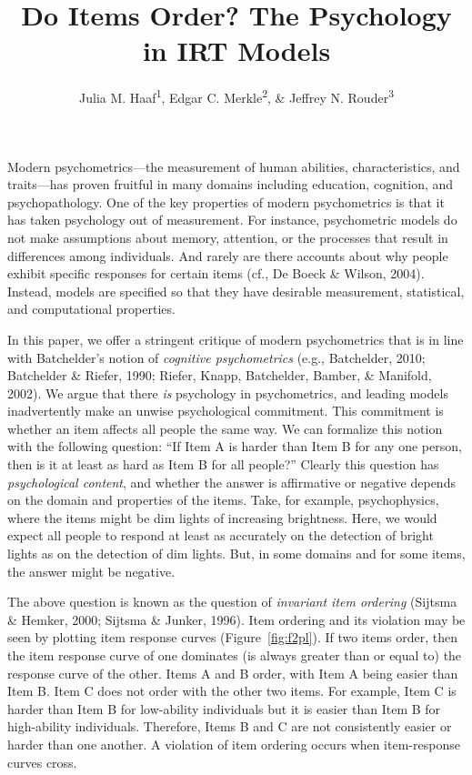 \documentclass[english,,man]{apa6}
\title{Do Items Order? The Psychology in IRT Models}
\author{Julia M. Haaf\textsuperscript{1}, Edgar C. Merkle\textsuperscript{2}, \& Jeffrey N. Rouder\textsuperscript{3}}
\date{}
\affiliation{
\vspace{0.5cm}
\textsuperscript{1} University of Amsterdam\\\textsuperscript{2} University of Missouri\\\textsuperscript{3} University of California, Irvine}
\begin{document}
\maketitle

Modern psychometrics---the measurement of human abilities, characteristics, and traits---has proven fruitful in many domains including education, cognition, and psychopathology. One of the key properties of modern psychometrics is that it has taken psychology out of measurement. For instance, psychometric models do not make assumptions about memory, attention, or the processes that result in differences among individuals. And rarely are there accounts about why people exhibit specific responses for certain items (cf., De Boeck \& Wilson, 2004). Instead, models are specified so that they have desirable measurement, statistical, and computational properties.

In this paper, we offer a stringent critique of modern psychometrics that is in line with Batchelder's notion of \emph{cognitive psychometrics} (e.g., Batchelder, 2010; Batchelder \& Riefer, 1990; Riefer, Knapp, Batchelder, Bamber, \& Manifold, 2002). We argue that there \emph{is} psychology in psychometrics, and leading models inadvertently make an unwise psychological commitment. This commitment is whether an item affects all people the same way. We can formalize this notion with the following question: \enquote{If Item A is harder than Item B for any one person, then is it at least as hard as Item B for all people?} Clearly this question has \emph{psychological content}, and whether the answer is affirmative or negative depends on the domain and properties of the items. Take, for example, psychophysics, where the items might be dim lights of increasing brightness. Here, we would expect all people to respond at least as accurately on the detection of bright lights as on the detection of dim lights. But, in some domains and for some items, the answer might be negative.

The above question is known as the question of \emph{invariant item ordering} (Sijtsma \& Hemker, 2000; Sijtsma \& Junker, 1996). Item ordering and its violation may be seen by plotting item response curves (Figure~\ref{fig:f2pl}). If two items order, then the item response curve of one dominates (is always greater than or equal to) the response curve of the other. Items A and B order, with Item A being easier than Item B. Item C does not order with the other two items. For example, Item C is harder than Item B for low-ability individuals but it is easier than Item B for high-ability individuals. Therefore, Items B and C are not consistently easier or harder than one another. A violation of item ordering occurs when item-response curves cross.
\end{document}
